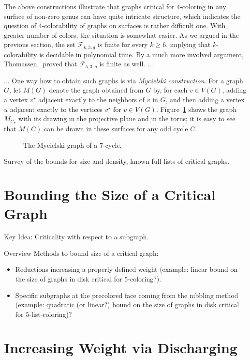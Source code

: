 \documentclass[12pt,twoside,openright,a4paper]{book}
\newcommand{\FF}{\mathcal{F}}
\begin{document}
The above constructions illustrate that graphs critical for $4$-coloring in any surface of non-zero genus
can have quite intricate structure, which indicates the question of $4$-colorability of graphs on surfaces
is rather difficult one.  With greater number of colors, the situation is somewhat easier.
As we argued in the previous section, the set $\FF_{k,3,g}$ is finite for every $k\ge 6$,
implying that $k$-colorability is decidable in polynomial time.  By a much more involved argument,
Thomassen~\cite{Thomassen97} proved that $\FF_{5,3,g}$ is finite as well. ... %

...
One way how to obtain such graphs is via \emph{Mycielski construction}.
For a graph $G$, let $M(G)$ denote the graph obtained from $G$ by, for each $v\in V(G)$, adding a vertex $v^\star$
adjacent exactly to the neighbors of $v$ in $G$, and then adding a vertex $u$ adjacent exactly to the vertices $v^\star$ for $v\in V(G)$.
Figure~\ref{fig-myc} shows the graph $M_{C_7}$ with its drawing in the projective plane and in the torus;
it is easy to see that $M(C)$ can be drawn in these surfaces for any odd cycle $C$.

\begin{figure}

\caption{The Mycielski graph of a $7$-cycle.}\label{fig-myc}
\end{figure}

Survey of the bounds for size and density, known full lists of critical graphs.


\section{Bounding the Size of a Critical Graph}
Key Idea: Criticality with respect to a subgraph.

Overview Methods to bound size of a critical graph:
\begin{itemize}
\item Reductions increasing a properly defined weight (example: linear bound on the size of graphs in disk
critical for $5$-coloring?).
\item Specific subgraphs at the precolored face coming from the nibbling method (example: quadratic (or linear?) bound
on the size of graphs in disk critical for $5$-list-coloring)?
\end{itemize}

\section{Increasing Weight via Discharging}
\end{document}
